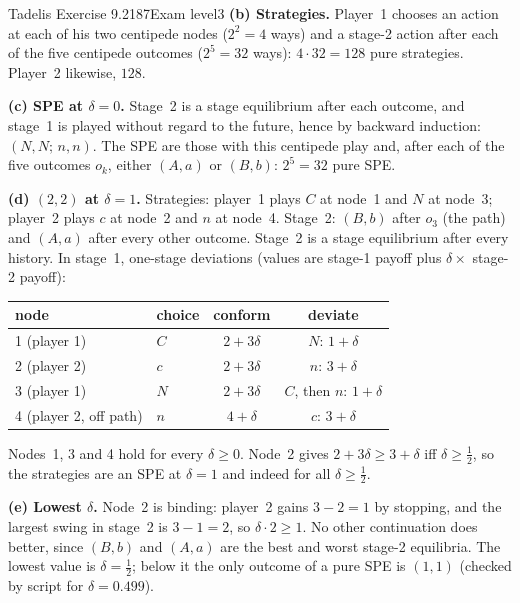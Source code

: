 \begin{exsol}{Tadelis Exercise 9.2}{187}{Exam level}{3}
\textbf{(b) Strategies.} Player~1 chooses an action at each of his two centipede nodes ($2^2 = 4$ ways) and a
stage-2 action after each of the five centipede outcomes ($2^5 = 32$ ways): $4\cdot 32 = 128$ pure
strategies. Player~2 likewise, $128$.

\textbf{(c) SPE at $\delta = 0$.} Stage~2 is a stage equilibrium after each outcome, and stage~1 is played
without regard to the future, hence by backward induction: $(N,N;\,n,n)$. The SPE are those with this
centipede play and, after each of the five outcomes $o_k$, either $(A,a)$ or $(B,b)$:
$2^5 = 32$ pure SPE.

\textbf{(d) $(2,2)$ at $\delta = 1$.} Strategies: player~1 plays $C$ at node~1 and $N$ at node~3; player~2
plays $c$ at node~2 and $n$ at node~4. Stage~2: $(B,b)$ after $o_3$ (the path) and $(A,a)$ after every other
outcome. Stage~2 is a stage equilibrium after every history. In stage~1, one-stage deviations
(values are stage-1 payoff plus $\delta\times$ stage-2 payoff):
\begin{center}
\begin{tabular}{llcc}
\toprule
node & choice & conform & deviate \\
\midrule
1 (player 1) & $C$ & $2 + 3\delta$ & $N$: $1 + \delta$ \\
2 (player 2) & $c$ & $2 + 3\delta$ & $n$: $3 + \delta$ \\
3 (player 1) & $N$ & $2 + 3\delta$ & $C$, then $n$: $1 + \delta$ \\
4 (player 2, off path) & $n$ & $4 + \delta$ & $c$: $3 + \delta$ \\
\bottomrule
\end{tabular}
\end{center}
Nodes~1, 3 and 4 hold for every $\delta \ge 0$. Node~2 gives $2 + 3\delta \ge 3 + \delta$ iff $\delta \ge \frac12$,
so the strategies are an SPE at $\delta = 1$ and indeed for all $\delta \ge \frac12$.

\textbf{(e) Lowest $\delta$.} Node~2 is binding: player~2 gains $3 - 2 = 1$ by stopping, and the largest swing in
stage~2 is $3 - 1 = 2$, so $\delta\cdot 2 \ge 1$. No other continuation does better, since $(B,b)$ and $(A,a)$ are
the best and worst stage-2 equilibria. The lowest value is $\delta = \frac12$; below it the only outcome
of a pure SPE is $(1,1)$ (checked by script for $\delta = 0.499$).


\end{exsol}
